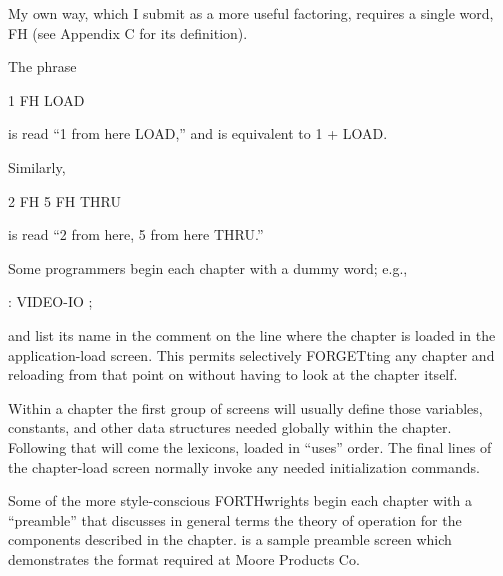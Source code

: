 My own way, which I submit as a more useful factoring, requires a single
word, FH (see Appendix C for its definition).

The phrase
\begin{Code}
1 FH LOAD
\end{Code}
is read ``1 from here LOAD,'' and is equivalent to 1 + LOAD.

Similarly,
\begin{Code}
2 FH   5 FH THRU
\end{Code}
is read ``2 from here, 5 from here THRU.''

Some programmers begin each chapter with a dummy word; e.g.,
\begin{Code}
: VIDEO-IO ;
\end{Code}
and list its name in the comment on the line where the chapter is loaded in
the application-load screen.  This permits selectively FORGETting any
chapter and reloading from that point on without having to look at the
chapter itself.

Within a chapter the first group of screens will usually define those
variables, constants, and other data structures needed globally within
the chapter.  Following that will come the lexicons, loaded in ``uses''
order.  The final lines of the chapter-load screen normally invoke any
needed initialization commands.

Some of the more style-conscious FORTHwrights begin each
chapter with a ``preamble'' that discusses in general terms the theory of
operation for the components described in the chapter.   is a
sample preamble screen which demonstrates the format required at
Moore Products Co.

